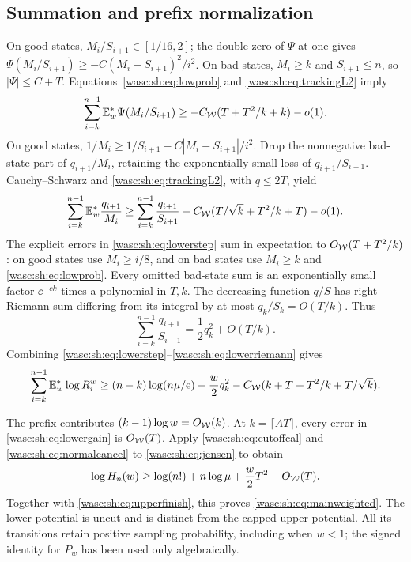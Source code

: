 \documentclass[11pt,a4paper]{article}
\theoremstyle{remark}\newtheorem{remark}[theorem]{Remark}
\numberwithin{equation}{section}
\begin{document}
\subsection{Summation and prefix normalization}
On good states, $M_i/S_{i+1}\in[1/16,2]$; the double zero of $\Psi$ at one gives
$\Psi(M_i/S_{i+1})\ge-C(M_i-S_{i+1})^2/i^2$.
On bad states, $M_i\ge k$ and $S_{i+1}\le n$, so $|\Psi|\le C+T$.
Equations~\eqref{wasc:sh:eq:lowprob} and \eqref{wasc:sh:eq:trackingL2} imply
\begin{equation}\label{wasc:sh:eq:psisum}
\sum_{i=k}^{n-1}\mathbb E_w^*\Psi(M_i/S_{i+1})
\ge-C_{\mathcal W}(T+T^2/k+k)-o(1).
\end{equation}
On good states,
$1/M_i\ge1/S_{i+1}-C|M_i-S_{i+1}|/i^2$.
Drop the nonnegative bad-state part of $q_{i+1}/M_i$, retaining the exponentially small loss of $q_{i+1}/S_{i+1}$. Cauchy--Schwarz and \eqref{wasc:sh:eq:trackingL2}, with $q\le2T$, yield
\begin{equation}\label{wasc:sh:eq:qrecipsum}
\sum_{i=k}^{n-1}\mathbb E_w^*\frac{q_{i+1}}{M_i}
\ge\sum_{i=k}^{n-1}\frac{q_{i+1}}{S_{i+1}}
-C_{\mathcal W}(T/\sqrt{k}+T^2/k+T)-o(1).
\end{equation}
The explicit errors in \eqref{wasc:sh:eq:lowerstep} sum in expectation to
$O_{\mathcal W}(T+T^2/k)$: on good states use $M_i\ge i/8$, and on bad states use $M_i\ge k$ and \eqref{wasc:sh:eq:lowprob}. Every omitted bad-state sum is an exponentially small factor $\ee^{-ck}$ times a polynomial in $T,k$.
The decreasing function $q/S$ has right Riemann sum differing from its integral by at most $q_k/S_k=O(T/k)$. Thus
\begin{equation}\label{wasc:sh:eq:lowerriemann}
\sum_{i=k}^{n-1}\frac{q_{i+1}}{S_{i+1}}=\frac12q_k^2+O(T/k).
\end{equation}
Combining \eqref{wasc:sh:eq:lowerstep}--\eqref{wasc:sh:eq:lowerriemann} gives
\begin{equation}\label{wasc:sh:eq:lowergain}
\sum_{i=k}^{n-1}\mathbb E_w^*\log R_i^w
\ge(n-k)\log(n\mu/\mathrm e)+\frac w2q_k^2
-C_{\mathcal W}(k+T+T^2/k+T/\sqrt{k}).
\end{equation}

The prefix contributes $(k-1)\log w=O_{\mathcal W}(k)$. At $k=\lceil AT\rceil$, every error in \eqref{wasc:sh:eq:lowergain} is $O_{\mathcal W}(T)$. Apply \eqref{wasc:sh:eq:cutoffcal} and \eqref{wasc:sh:eq:normalcancel} to \eqref{wasc:sh:eq:jensen} to obtain
\[
\log H_n(w)\ge\log(n!)+n\log\mu+\frac w2T^2-O_{\mathcal W}(T).
\]
Together with \eqref{wasc:sh:eq:upperfinish}, this proves \eqref{wasc:sh:eq:mainweighted}. The lower potential is uncut and is distinct from the capped upper potential. All its transitions retain positive sampling probability, including when $w<1$; the signed identity for $P_w$ has been used only algebraically.
\end{document}
